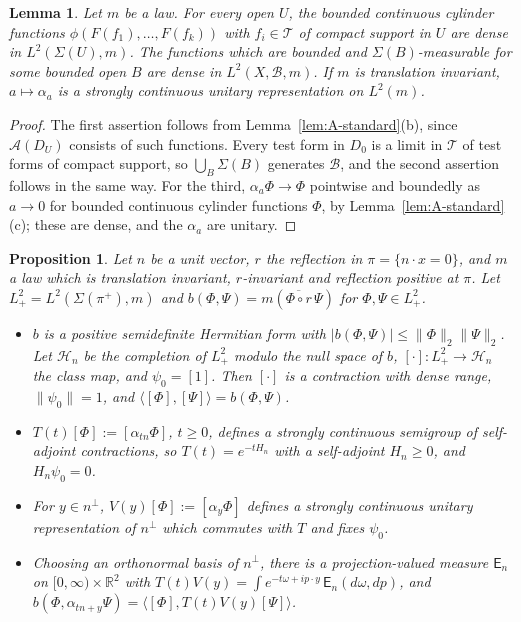 \documentclass[11pt]{amsart}
\theoremstyle{plain}
\newtheorem{proposition}[theorem]{Proposition}
\newtheorem{lemma}[theorem]{Lemma}
\theoremstyle{definition}
\theoremstyle{remark}
\numberwithin{equation}{section}
\newcommand{\R}{\mathbb{R}}
\newcommand{\cA}{\mathcal{A}}
\newcommand{\cB}{\mathcal{B}}
\newcommand{\cH}{\mathcal{H}}
\newcommand{\cT}{\mathcal{T}}
\newcommand{\abs}[1]{\lvert #1\rvert}
\newcommand{\norm}[1]{\lVert #1\rVert}
\newcommand{\ip}[2]{\langle #1,#2\rangle}
\begin{document}
\begin{lemma}\label{lem:B-density}
Let $m$ be a law. For every open $U$, the bounded continuous cylinder functions $\phi(F(f_1),\dots,F(f_k))$ with $f_i\in\cT$ of compact support in $U$ are dense in $L^2(\Sigma(U),m)$. The functions which are bounded and $\Sigma(B)$-measurable for some bounded open $B$ are dense in $L^2(X,\cB,m)$. If $m$ is translation invariant, $a\mapsto\alpha_a$ is a strongly continuous unitary representation on $L^2(m)$.
\end{lemma}

\begin{proof}
The first assertion follows from Lemma~\ref{lem:A-standard}(b), since $\cA(D_U)$ consists of such functions. Every test form in $D_0$ is a limit in $\cT$ of test forms of compact support, so $\bigcup_B\Sigma(B)$ generates $\cB$, and the second assertion follows in the same way. For the third, $\alpha_a\Phi\to\Phi$ pointwise and boundedly as $a\to0$ for bounded continuous cylinder functions $\Phi$, by Lemma~\ref{lem:A-standard}(c); these are dense, and the $\alpha_a$ are unitary.
\end{proof}

\begin{proposition}\label{prop:B-recon}
Let $n$ be a unit vector, $r$ the reflection in $\pi=\{n\cdot x=0\}$, and $m$ a law which is translation invariant, $r$-invariant and reflection positive at $\pi$. Let $L^2_+=L^2(\Sigma(\pi^+),m)$ and $b(\Phi,\Psi)=m(\overline{\Phi\circ r}\,\Psi)$ for $\Phi,\Psi\in L^2_+$.
\begin{itemize}
\item[(a)] $b$ is a positive semidefinite Hermitian form with $\abs{b(\Phi,\Psi)}\le\norm\Phi_2\norm\Psi_2$. Let $\cH_n$ be the completion of $L^2_+$ modulo the null space of $b$, $[\cdot]:L^2_+\to\cH_n$ the class map, and ${\psi_0}=[1]$. Then $[\cdot]$ is a contraction with dense range, $\norm{\psi_0}=1$, and $\ip{[\Phi]}{[\Psi]}=b(\Phi,\Psi)$.
\item[(b)] $T(t)[\Phi]:=[\alpha_{tn}\Phi]$, $t\ge0$, defines a strongly continuous semigroup of self-adjoint contractions, so $T(t)=e^{-tH_n}$ with a self-adjoint $H_n\ge0$, and $H_n{\psi_0}=0$.
\item[(c)] For $y\in n^\perp$, $V(y)[\Phi]:=[\alpha_y\Phi]$ defines a strongly continuous unitary representation of $n^\perp$ which commutes with $T$ and fixes ${\psi_0}$.
\item[(d)] Choosing an orthonormal basis of $n^\perp$, there is a projection-valued measure $\mathsf E_n$ on $[0,\infty)\times\R^2$ with $T(t)V(y)=\int e^{-t\omega+ip\cdot y}\,\mathsf E_n(d\omega,dp)$, and $b(\Phi,\alpha_{tn+y}\Psi)=\ip{[\Phi]}{T(t)V(y)[\Psi]}$.
\end{itemize}
\end{proposition}
\end{document}
